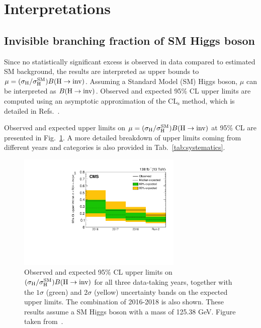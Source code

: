 \section{Interpretations}
\label{sec:interpretations}

\graphicspath{{4_Results/Figures}}

\subsection{Invisible branching fraction of SM Higgs boson}

Since no statistically significant excess is observed in data compared to estimated SM background,
the results are interpreted as upper bounds to $\mu=(\sigma_{\mathrm{H}}/\sigma_{\mathrm{H}}^{\mathrm{SM}}) {B(\textrm{H}\rightarrow\text{inv})}$. Assuming a Standard Model (SM) Higgs boson,
$\mu$ can be interpreted as ${{B}(\textrm{H}\rightarrow\text{inv})}$.
Observed and expected 95\% CL upper limits are computed using an asymptotic approximation of the $\mathrm{CL}_{\mathrm{s}}$
method, which is detailed in Refs.~\cite{Junk:1999kv,Read:2002av}.

Observed and expected upper limits on $\mu={(\sigma_{\mathrm{H}}/\sigma_{\mathrm{H}}^{\mathrm{SM}}) {B(\textrm{H}\rightarrow\text{inv})}}$ at 95\% CL are
presented in Fig.~\ref{fig:limit_short}. A more detailed breakdown of upper limits coming from different years
and categories is also provided in Tab.~\ref{tab:systematics}. 

\begin{figure}[htbp]
    \centering
    \includegraphics[width=0.7\textwidth]{from_paper/limits/limit_short.pdf}
    \caption{Observed and expected 95\% CL upper limits on $(\sigma_{\mathrm{H}}/\sigma_{\mathrm{H}}^{\mathrm{SM}}) {B(\textrm{H}\rightarrow\text{inv})}$ for all three data-taking years,
    together with the $1\sigma$ (green) and $2\sigma$ (yellow) uncertainty bands on the expected upper limits.
    The combination of 2016-2018 is also shown. These results assume a SM Higgs boson with a mass of 125.38 GeV.
    Figure taken from~\cite{VBFHinvAnalysisPaper}.}
    \label{fig:limit_short}
\end{figure}

